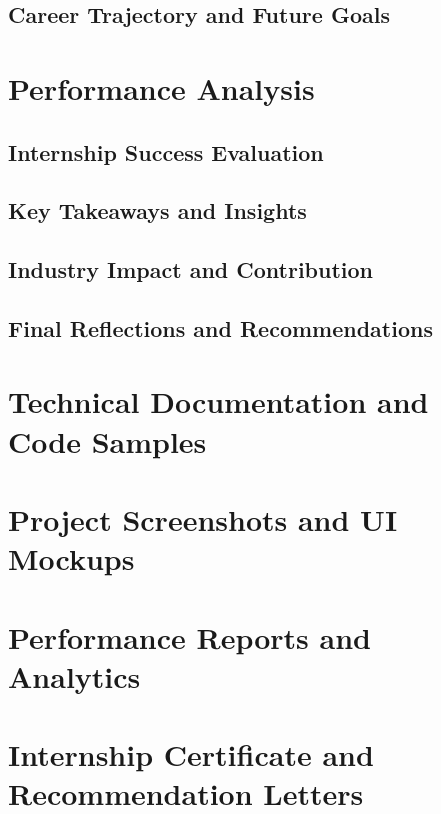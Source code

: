 \documentclass[a4paper, 11pt, oneside]{report}
\begin{document}
  \section{Career Trajectory and Future Goals}
  

\chapter{Performance Analysis}
  \section{Internship Success Evaluation}
  \section{Key Takeaways and Insights}
  \section{Industry Impact and Contribution}
  \section{Final Reflections and Recommendations}
  

\appendix
\chapter{Technical Documentation and Code Samples}
\chapter{Project Screenshots and UI Mockups}
\chapter{Performance Reports and Analytics}
\chapter{Internship Certificate and Recommendation Letters}



\end{document}
